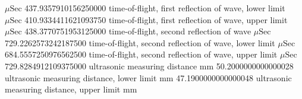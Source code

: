 \expandafter\def\csname oct2tex.air_d50_v800_P.t2.u\endcsname{\ensuremath{\mu\text{Sec}}}
\expandafter\def\csname oct2tex.air_d50_v800_P.t2.v\endcsname{437.9357910156250000}
\expandafter\def\csname oct2tex.air_d50_v800_P.t2a.d\endcsname{time-of-flight, first reflection of wave, lower limit}
\expandafter\def\csname oct2tex.air_d50_v800_P.t2a.u\endcsname{\ensuremath{\mu\text{Sec}}}
\expandafter\def\csname oct2tex.air_d50_v800_P.t2a.v\endcsname{410.9334411621093750}
\expandafter\def\csname oct2tex.air_d50_v800_P.t2b.d\endcsname{time-of-flight, first reflection of wave, upper limit}
\expandafter\def\csname oct2tex.air_d50_v800_P.t2b.u\endcsname{\ensuremath{\mu\text{Sec}}}
\expandafter\def\csname oct2tex.air_d50_v800_P.t2b.v\endcsname{438.3770751953125000}
\expandafter\def\csname oct2tex.air_d50_v800_P.t3.d\endcsname{time-of-flight, second reflection of wave}
\expandafter\def\csname oct2tex.air_d50_v800_P.t3.u\endcsname{\ensuremath{\mu\text{Sec}}}
\expandafter\def\csname oct2tex.air_d50_v800_P.t3.v\endcsname{729.2262573242187500}
\expandafter\def\csname oct2tex.air_d50_v800_P.t3a.d\endcsname{time-of-flight, second reflection of wave, lower limit}
\expandafter\def\csname oct2tex.air_d50_v800_P.t3a.u\endcsname{\ensuremath{\mu\text{Sec}}}
\expandafter\def\csname oct2tex.air_d50_v800_P.t3a.v\endcsname{684.5557250976562500}
\expandafter\def\csname oct2tex.air_d50_v800_P.t3b.d\endcsname{time-of-flight, second reflection of wave, upper limit}
\expandafter\def\csname oct2tex.air_d50_v800_P.t3b.u\endcsname{\ensuremath{\mu\text{Sec}}}
\expandafter\def\csname oct2tex.air_d50_v800_P.t3b.v\endcsname{729.8284912109375000}
\expandafter\def\csname oct2tex.air_d50_v800_P.umd.d\endcsname{ultrasonic measuring distance}
\expandafter\def\csname oct2tex.air_d50_v800_P.umd.u\endcsname{\ensuremath{\text{mm}}}
\expandafter\def\csname oct2tex.air_d50_v800_P.umd.v\endcsname{50.2000000000000028}
\expandafter\def\csname oct2tex.air_d50_v800_P.umda.d\endcsname{ultrasonic measuring distance, lower limit}
\expandafter\def\csname oct2tex.air_d50_v800_P.umda.u\endcsname{\ensuremath{\text{mm}}}
\expandafter\def\csname oct2tex.air_d50_v800_P.umda.v\endcsname{47.1900000000000048}
\expandafter\def\csname oct2tex.air_d50_v800_P.umdb.d\endcsname{ultrasonic measuring distance, upper limit}
\expandafter\def\csname oct2tex.air_d50_v800_P.umdb.u\endcsname{\ensuremath{\text{mm}}}
